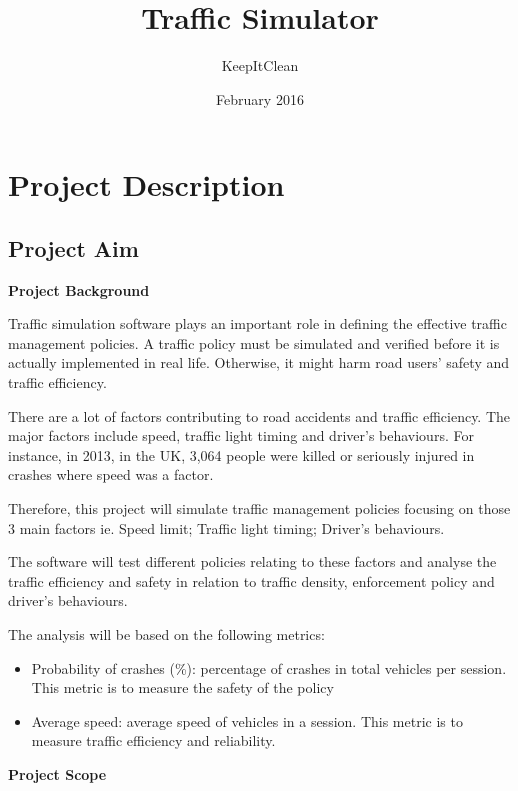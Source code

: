 \documentclass[11pt]{article}
\author{KeepItClean}
\title{Traffic Simulator}
\date{February 2016}
\begin{document}
\maketitle

\section{Project Description}
\subsection{Project Aim}
\begin{flushleft}
\textbf{Project Background}\par	
\end{flushleft}

Traffic simulation software plays an important role in defining the effective traffic management policies. A traffic policy must be simulated and verified before it is actually implemented in real life. Otherwise, it might harm road users’ safety and traffic efficiency.

There are a lot of factors contributing to road accidents and traffic efficiency. The major factors include speed, traffic light timing and driver’s behaviours. For instance, in 2013, in the UK, 3,064 people were killed or seriously injured in crashes where speed was a factor.

Therefore, this project will simulate traffic management policies focusing on those 3 main factors ie. Speed limit; Traffic light timing; Driver’s behaviours.

The software will test different policies relating to these factors and analyse the traffic efficiency and safety in relation to traffic density, enforcement policy and driver’s behaviours.

The analysis will be based on the following metrics:
\begin{itemize}
	\item Probability of crashes (\%): percentage of crashes in total vehicles per session. This metric is to measure the safety of the policy
	\item Average speed: average speed of vehicles in a session. This metric is to measure traffic efficiency and reliability.
\end{itemize}

\begin{flushleft}
\textbf{Project Scope} \par	
\end{flushleft}
\end{document}
